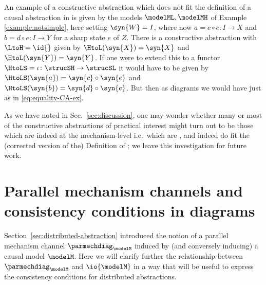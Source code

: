 \documentclass{article}
\begin{document}
{{\begin{example}
An example of a constructive abstraction which does not fit the definition of a causal abstraction in \cite{englberger2025causal} is given by the models $\modelML, \modelMH$ of Example \ref{example:notsimple}, here setting $\syn{W} = I$, where now $a = c \circ e \colon I \to X$ and $b = d \circ e \colon I \to Y$ for a sharp state $e$ of $Z$. There is a constructive abstraction with $\LtoH=\id{}$ given by $\HtoL(\syn{X}) = \syn{X}$ and $\HtoL(\syn{Y}) = \syn{Y}$. If one were to extend this to a functor $\HtoLS = \iota \colon \strucSH \to \strucSL$ it would have to be given by $\HtoLS(\syn{a}) = \syn{c} \circ \syn{e}$ and $\HtoLS(\syn{b}) = \syn{d} \circ \syn{e}$. But then as diagrams we would have  just as in \eqref{eq:equality-CA-ex}.
\end{example}

\begin{remark}
As we have noted in Sec.~\ref{sec:discussion}, 
one may wonder whether many or most of  
the constructive abstractions of practical interest 
might turn out to be those which are indeed at the mechanism-level i.e.~which are \extrastrong, and indeed do fit the (corrected version of the) Definition of \cite{englberger2025causal}; we leave this investigation for future work. 
\end{remark}
}


\section{Parallel mechanism channels and consistency conditions in diagrams} 
\label{app:abs-in-pm-via-tracedC} 

Section~\ref{sec:distributed-abstraction} introduced the notion of a parallel mechanism channel $\parmechdiag_\modelM$ induced by (and conversely inducing) a causal model $\modelM$.  
Here we will clarify further the relationship between $\parmechdiag_\modelM$ and $\io{\modelM}$ in a way that will be useful to express the consistency conditions for distributed abstractions.

}
\end{document}
